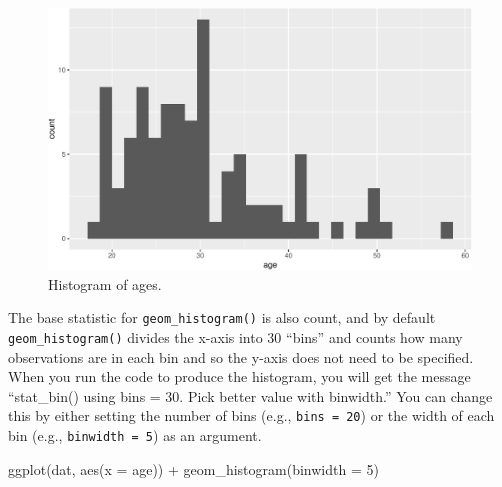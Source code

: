 \documentclass[
  english,
  doc,floatsintext]{apa6}
\newenvironment{Shaded}{\begin{snugshade}}{\end{snugshade}}
\newcommand{\AttributeTok}[1]{\textcolor[rgb]{0.77,0.63,0.00}{#1}}
\newcommand{\DecValTok}[1]{\textcolor[rgb]{0.00,0.00,0.81}{#1}}
\newcommand{\FunctionTok}[1]{\textcolor[rgb]{0.00,0.00,0.00}{#1}}
\newcommand{\NormalTok}[1]{#1}
\newcommand{\SpecialCharTok}[1]{\textcolor[rgb]{0.00,0.00,0.00}{#1}}
\begin{document}
\begin{figure}

{\centering \includegraphics[width=1\linewidth]{images/histogram1-1} 

}

\caption{Histogram of ages.}\label{fig:histogram1}
\end{figure}

The base statistic for \texttt{geom\_histogram()} is also count, and by default \texttt{geom\_histogram()} divides the x-axis into 30 ``bins'' and counts how many observations are in each bin and so the y-axis does not need to be specified. When you run the code to produce the histogram, you will get the message ``stat\_bin() using bins = 30. Pick better value with binwidth.'' You can change this by either setting the number of bins (e.g., \texttt{bins\ =\ 20}) or the width of each bin (e.g., \texttt{binwidth\ =\ 5}) as an argument.

\begin{Shaded}
\begin{Highlighting}[]
\FunctionTok{ggplot}\NormalTok{(dat, }\FunctionTok{aes}\NormalTok{(}\AttributeTok{x =}\NormalTok{ age)) }\SpecialCharTok{+}
  \FunctionTok{geom\_histogram}\NormalTok{(}\AttributeTok{binwidth =} \DecValTok{5}\NormalTok{)}
\end{Highlighting}
\end{Shaded}
\end{document}
